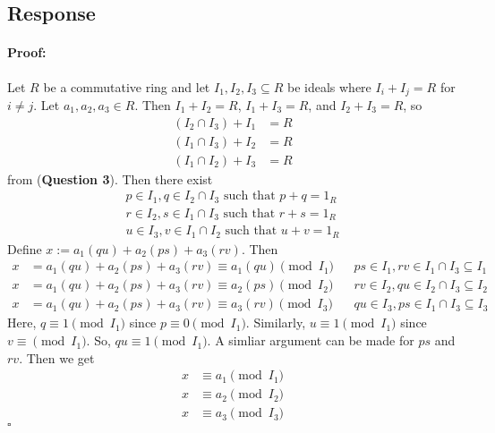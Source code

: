 \documentclass [12pt] {article}
\newenvironment{proof}{\paragraph{Proof:}}{\hfill$\square$}
\renewcommand{\bf}[1]{\textbf{{#1}}}
\begin{document}
\subsection*{Response}
\begin{proof}
Let $R$ be a commutative ring and let $I_1, I_2, I_3 \subseteq R$ be ideals where 
$I_i + I_j = R$ for $i \neq j$. Let $a_1, a_2, a_3 \in R$.
Then $I_1 + I_2 = R$, $I_1 + I_3 = R$, and $I_2 + I_3 = R$, so 
\begin{align*}
    (I_2 \cap I_3) + I_1 &= R \\
    (I_1 \cap I_3) + I_2 &= R \\
    (I_1 \cap I_2) + I_3 &= R
\end{align*}
from (\bf{Question 3}).
Then there exist 
\begin{align*}
    p \in I_1, q \in I_2 \cap I_3 \text{ such that } p + q = 1_R \\
    r \in I_2, s \in I_1 \cap I_3 \text{ such that } r + s = 1_R \\
    u \in I_3, v \in I_1 \cap I_2 \text{ such that } u + v = 1_R
\end{align*}
Define
$x := a_1(qu) + a_2(ps) + a_3(rv)$. Then
\begin{align*}
    x &= a_1(qu) + a_2(ps) + a_3(rv) 
    \equiv a_1(qu) \pmod{I_1} && ps \in I_1, rv \in I_1 \cap I_3 \subseteq I_1 \\
    x &= a_1(qu) + a_2(ps) + a_3(rv) 
    \equiv a_2(ps) \pmod{I_2} && rv \in I_2, qu \in I_2 \cap I_3 \subseteq I_2 \\
    x &= a_1(qu) + a_2(ps) + a_3(rv) 
    \equiv a_3(rv) \pmod{I_3} && qu \in I_3, ps \in I_1 \cap I_3 \subseteq I_3
\end{align*}
Here, $q \equiv 1 \pmod{I_1}$ since $p \equiv 0 \pmod{I_1}$. Similarly, $u \equiv 1 \pmod{I_1}$ 
since $v \equiv \pmod{I_1}$. So, $qu \equiv 1 \pmod{I_1}$. A simliar argument can be made for 
$ps$ and $rv$. Then we get
\begin{align*}
      x &\equiv a_1 \pmod{I_1} \\
      x &\equiv a_2 \pmod{I_2} \\
      x &\equiv a_3 \pmod{I_3}
\end{align*}
\end{proof}
\end{document}
